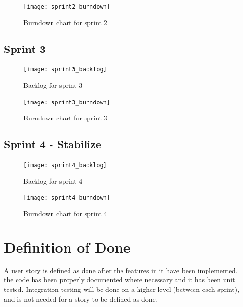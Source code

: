 \documentclass[a4paper,12pt]{article}
\begin{document}
\begin{figure}[H]
	\centering
	\texttt{[image: sprint2\_burndown]}
	\caption{Burndown chart for sprint 2}
\end{figure}

\subsection{Sprint 3}
\begin{figure}[H]
	\centering
	\texttt{[image: sprint3\_backlog]}
	\caption{Backlog for sprint 3}
\end{figure}

\begin{figure}[H]
	\centering
	\texttt{[image: sprint3\_burndown]}
	\caption{Burndown chart for sprint 3}
\end{figure}

\subsection{Sprint 4 - Stabilize}
\begin{figure}[H]
	\centering
	\texttt{[image: sprint4\_backlog]}
	\caption{Backlog for sprint 4}
\end{figure}

\begin{figure}[H]
	\centering
	\texttt{[image: sprint4\_burndown]}
	\caption{Burndown chart for sprint 4}
\end{figure}

\section{Definition of Done}
A user story is defined as done after the features in it have been implemented,
the code has been properly documented where necessary and it has been
unit tested. Integration testing will be done on a higher level (between each
sprint), and is not needed for a story to be defined as done.
\end{document}

